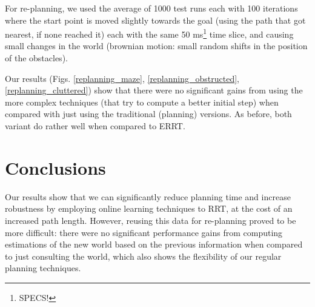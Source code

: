 \documentclass[10pt,twoside,twocolumn]{article}
\begin{document}
For re-planning, we used the average of 1000 test runs each with 100 iterations where the start point is moved slightly towards the goal (using the path that got nearest, if none reached it) each with the same 50 ms\footnote{SPECS!} time slice, and causing small changes in the world (brownian motion: small random shifts in the position of the obstacles).

Our results (Figs. \ref{replanning_maze}, \ref{replanning_obstructed}, \ref{replanning_cluttered}) show that there were no significant gains from using the more complex techniques (that try to compute a better initial step) when compared with just using the traditional (planning) versions. As before, both variant do rather well when compared to ERRT.





\section{Conclusions}

Our results show that we can significantly reduce planning time and increase robustness by employing online learning techniques to RRT, at the cost of an increased path length. However, reusing this data for re-planning proved to be more difficult: there were no significant performance gains from computing estimations of the new world based on the previous information when compared to just consulting the world, which also shows the flexibility of our regular planning techniques.
\end{document}
